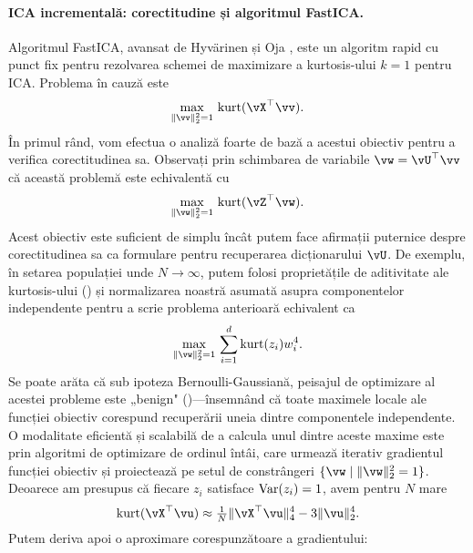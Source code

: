 \documentclass[../../book-main_ro.tex]{subfiles}
\begin{document}
\paragraph{ICA incrementală: corectitudine și algoritmul FastICA.}
Algoritmul FastICA, avansat de Hyv\"{a}rinen și Oja \cite{hyvarinen-1997}, este un algoritm rapid cu punct fix pentru rezolvarea schemei de maximizare a kurtosis-ului $k=1$ pentru ICA.
Problema în cauză este
\begin{equation}\label{eq:kurtosis-maximization-sphere-finitesample}
    \max_{\norm{\vv}_2^2 = 1}\, \kurt(\vX^\top \vv).
\end{equation}
În primul rând, vom efectua o analiză foarte de bază a acestui obiectiv pentru a verifica corectitudinea sa. Observați prin schimbarea de variabile $\vw = \vU^\top \vv$ că această problemă este echivalentă cu
\begin{equation*}
    \max_{\norm{\vw}_2^2 = 1}\, 
    \mathrm{kurt}(\vZ^\top \vw).
\end{equation*}
Acest obiectiv este suficient de simplu încât putem face afirmații puternice despre corectitudinea sa ca formulare pentru recuperarea dicționarului $\vU$.
De exemplu, în setarea populației unde $N \to \infty$, 
putem folosi proprietățile de aditivitate ale kurtosis-ului () și normalizarea noastră asumată asupra componentelor independente pentru a scrie problema anterioară echivalent ca
\begin{equation}\label{eq:kurtosis-maximization-sphere-population-simple}
    \max_{\norm{\vw}_2^2 = 1}\, 
    \sum_{i=1}^d \mathrm{kurt}(z_i) w_i^4.
\end{equation}
Se poate arăta că sub ipoteza Bernoulli-Gaussiană, peisajul de optimizare al acestei probleme este „benign" ()---însemnând că toate maximele locale ale funcției obiectiv corespund recuperării uneia dintre componentele independente.
O modalitate eficientă și scalabilă de a calcula unul dintre aceste maxime este prin algoritmi de optimizare de ordinul întâi, care urmează iterativ gradientul funcției obiectiv și proiectează pe setul de constrângeri $\set{\vw \given \norm{\vw}_2^2 = 1}$.
Deoarece am presupus că fiecare $z_i$ satisface $\operatorname{Var}(z_i)=1$, avem 
pentru $N$ mare
\begin{equation}\label{eq:kurtosis-approximation-l4}
    \kurt(\vX^\top \vu)
    \approx
    \tfrac{1}{N} \norm{\vX^\top \vu}_4^4 - 3 \norm{\vu}_2^4.
\end{equation}
Putem deriva apoi o aproximare corespunzătoare a gradientului:
\end{document}
